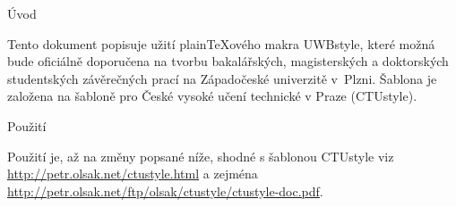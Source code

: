 
\def\ctustyle{{\tenss CTUstyle}}
\def\uwbstyle{{\tenss UWBstyle}}
\def\ttb{\tt\char`\\} %

\chap Úvod

Tento dokument popisuje užití plain\TeX{}ového makra \uwbstyle{}, které možná bude oficiálně doporučena na tvorbu bakalářských, magisterských a doktorských studentských závěrečných prací na Západočeské univerzitě v~Plzni. Šablona je založena na šabloně pro České vysoké učení technické v Praze (\ctustyle{}).

\sec Použití

Použití je, až na změny popsané níže, shodné s šablonou \ctustyle{} viz \url{http://petr.olsak.net/ctustyle.html} a zejména \url{http://petr.olsak.net/ftp/olsak/ctustyle/ctustyle-doc.pdf}.
